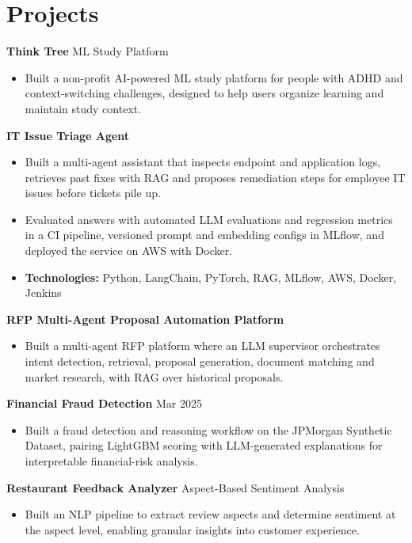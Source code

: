 \documentclass[10pt,a4paper]{article}
\begin{document}
\section{Projects}
\textbf{Think Tree} \textbar{} ML Study Platform\par
\begin{itemize}
  \item Built a non-profit AI-powered ML study platform for people with ADHD and context-switching challenges, designed to help users organize learning and maintain study context.
\end{itemize}
\textbf{IT Issue Triage Agent}\par
\begin{itemize}
  \item Built a multi-agent assistant that inspects endpoint and application logs, retrieves past fixes with RAG and proposes remediation steps for employee IT issues before tickets pile up.
  \item Evaluated answers with automated LLM evaluations and regression metrics in a CI pipeline, versioned prompt and embedding configs in MLflow, and deployed the service on AWS with Docker.
  \item \textbf{Technologies:} Python, LangChain, PyTorch, RAG, MLflow, AWS, Docker, Jenkins
\end{itemize}
\textbf{RFP Multi-Agent Proposal Automation Platform}\par
\begin{itemize}
  \item Built a multi-agent RFP platform where an LLM supervisor orchestrates intent detection, retrieval, proposal generation, document matching and market research, with RAG over historical proposals.
\end{itemize}
\textbf{Financial Fraud Detection} \textbar{} Mar 2025\par
\begin{itemize}
  \item Built a fraud detection and reasoning workflow on the JPMorgan Synthetic Dataset, pairing LightGBM scoring with LLM-generated explanations for interpretable financial-risk analysis.
\end{itemize}
\textbf{Restaurant Feedback Analyzer} \textbar{} Aspect-Based Sentiment Analysis\par
\begin{itemize}
  \item Built an NLP pipeline to extract review aspects and determine sentiment at the aspect level, enabling granular insights into customer experience.
\end{itemize}
\end{document}
